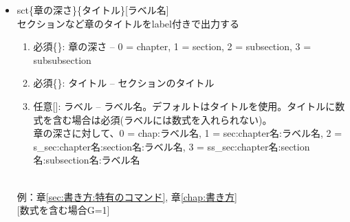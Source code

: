 \documentclass[uplatex, a4paper, dvipdfmx, 12pt]{jsreport}
\begin{document}
	\begin{itemize}
		\item \tbs sct\{章の深さ\}\{タイトル\}[ラベル名]\\
				セクションなど章のタイトルをlabel付きで出力する
				\begin{enumerate}
					\item  必須\{\}: 章の深さ -- 0 = chapter, 1 = section, 2 = subsection, 3 = subsubsection
					\item  必須\{\}: タイトル -- セクションのタイトル
					\item  任意[]: ラベル -- ラベル名。デフォルトはタイトルを使用。タイトルに数式を含む場合は必須(ラベルには数式を入れられない)。\\
										章の深さに対して、0 = chap:ラベル名, 1 = sec:chapter名:ラベル名, 2 = s\_sec:chapter名:section名:ラベル名, 3 = ss\_sec:chapter名:section名:subsection名:ラベル名
				\end{enumerate}
				\\
				例：章\ref{sec:書き方:特有のコマンド}, 章\ref{chap:書き方}\\


\end{itemize}
\end{document}
